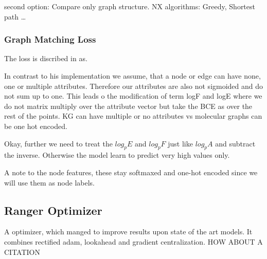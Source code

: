 second option: \leavevmode
Compare only graph structure. 
NX algorithms: Greedy, Shortest path \dots
\\
\subsubsection{Graph Matching Loss}
The loss is discribed in \cite{simonovsky_graphvae_2018} as.

In contrast to his implementation we assume, that a node or edge can have none, one or multiple attributes. Therefore our attributes are also not sigmoided and do not sum up to one. This leads o the modification of term logF and logE where we do not matrix multiply over the attribute vector but take the BCE as over the rest of the points.
KG can have multiple or no attributes vs molecular graphs can be one hot encoded.

Okay, further we need to treat the $log_pE$ and $log_pF$ just like $log_pA$ and subtract the inverse. Otherwise the model learn to predict very high values only. 

A note to the node features, these stay softmaxed and one-hot encoded since we will use them as node labels.


\subsection{Ranger Optimizer}
A optimizer, which manged to improve results upon state of the art models. It combines rectified adam, lookahead and gradient centralization.
HOW ABOUT A CITATION
